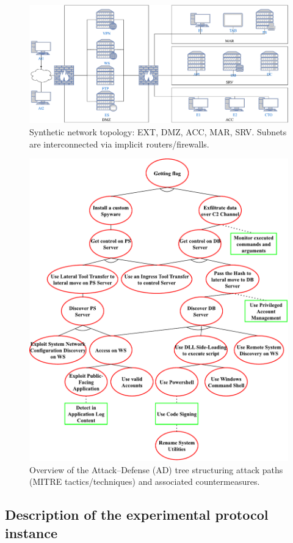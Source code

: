 {\begin{figure}[h!]
\centering
\includegraphics[width=\linewidth]{figures/topology.pdf}
\caption{Synthetic network topology: EXT, DMZ, ACC, MAR, SRV. Subnets are interconnected via implicit routers/firewalls.}
\label{fig:scenario_network_topology}
\end {figure}

\begin{figure}[h!]
  \centering
  \includegraphics[width=0.86\linewidth]{figures/ADTree.pdf}
  \caption{Overview of the Attack–Defense (AD) tree structuring attack paths (MITRE tactics/techniques) and associated countermeasures. }
  \label{fig:ADTree}
\end{figure}


\subsection{Description of the experimental protocol instance}

}
